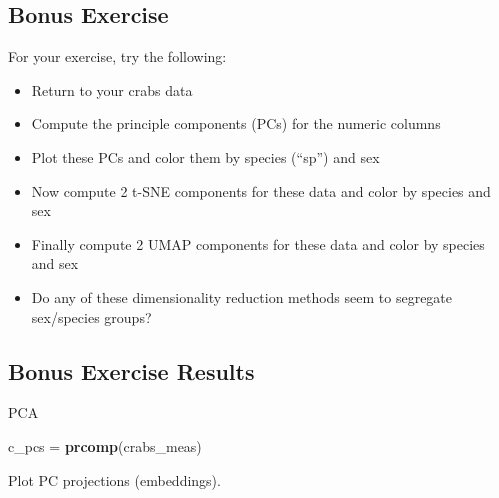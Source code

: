 \documentclass[
]{book}
\newenvironment{Shaded}{\begin{snugshade}}{\end{snugshade}}
\newcommand{\AttributeTok}[1]{\textcolor[rgb]{0.13,0.29,0.53}{#1}}
\newcommand{\CommentTok}[1]{\textcolor[rgb]{0.56,0.35,0.01}{\textit{#1}}}
\newcommand{\FunctionTok}[1]{\textcolor[rgb]{0.13,0.29,0.53}{\textbf{#1}}}
\newcommand{\NormalTok}[1]{#1}
\newcommand{\OtherTok}[1]{\textcolor[rgb]{0.56,0.35,0.01}{#1}}
\newcommand{\SpecialCharTok}[1]{\textcolor[rgb]{0.81,0.36,0.00}{\textbf{#1}}}
\newcommand{\StringTok}[1]{\textcolor[rgb]{0.31,0.60,0.02}{#1}}
\providecommand{\tightlist}{%
  \setlength{\itemsep}{0pt}\setlength{\parskip}{0pt}}
\begin{document}
\begin{Shaded}
\end{Shaded}

\subsection{Bonus Exercise}\label{bonus-exercise-1}

For your exercise, try the following:

\begin{itemize}
\tightlist
\item
  Return to your crabs data
\item
  Compute the principle components (PCs) for the numeric columns
\item
  Plot these PCs and color them by species (``sp'') and sex
\item
  Now compute 2 t-SNE components for these data and color by species and sex
\item
  Finally compute 2 UMAP components for these data and color by species and sex
\item
  Do any of these dimensionality reduction methods seem to segregate sex/species groups?
\end{itemize}

\subsection{Bonus Exercise Results}\label{bonus-exercise-results-1}

PCA

\begin{Shaded}
\begin{Highlighting}[]
\NormalTok{c\_pcs }\OtherTok{=} \FunctionTok{prcomp}\NormalTok{(crabs\_meas)}
\end{Highlighting}
\end{Shaded}

Plot PC projections (embeddings).

\begin{Shaded}
\end{Shaded}
\end{document}
